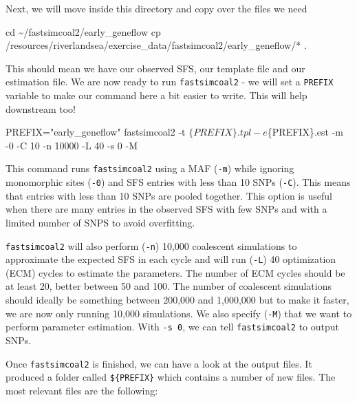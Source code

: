 \documentclass[
  letterpaper,
  DIV=11,
  numbers=noendperiod]{scrartcl}
\newenvironment{Shaded}{\begin{snugshade}}{\end{snugshade}}
\newcommand{\NormalTok}[1]{\textcolor[rgb]{0.00,0.23,0.31}{#1}}
\begin{document}
Next, we will move inside this directory and copy over the files we need

\begin{Shaded}
\begin{Highlighting}[]
\NormalTok{cd \textasciitilde{}/fastsimcoal2/early\_geneflow}
\NormalTok{cp /resources/riverlandsea/exercise\_data/fastsimcoal2/early\_geneflow/* .}
\end{Highlighting}
\end{Shaded}

This should mean we have our observed SFS, our template file and our
estimation file. We are now ready to run \texttt{fastsimcoal2} - we will
set a \texttt{PREFIX} variable to make our command here a bit easier to
write. This will help downstream too!

\begin{Shaded}
\begin{Highlighting}[]
\NormalTok{PREFIX="early\_geneflow"}
\NormalTok{fastsimcoal2 {-}t $\{PREFIX\}.tpl {-}e $\{PREFIX\}.est {-}m {-}0 {-}C 10 {-}n 10000 {-}L 40 {-}s 0 {-}M}
\end{Highlighting}
\end{Shaded}

This command runs \texttt{fastsimcoal2} using a MAF (\texttt{-m}) while
ignoring monomorphic sites (\texttt{-0}) and SFS entries with less than
10 SNPs (\texttt{-C}). This means that entries with less than 10 SNPs
are pooled together. This option is useful when there are many entries
in the observed SFS with few SNPs and with a limited number of SNPS to
avoid overfitting.

\texttt{fastsimcoal2} will also perform (\texttt{-n}) 10,000 coalescent
simulations to approximate the expected SFS in each cycle and will run
(\texttt{-L}) 40 optimization (ECM) cycles to estimate the parameters.
The number of ECM cycles should be at least 20, better between 50 and
100. The number of coalescent simulations should ideally be something
between 200,000 and 1,000,000 but to make it faster, we are now only
running 10,000 simulations. We also specify (\texttt{-M}) that we want
to perform parameter estimation. With \texttt{-s\ 0}, we can tell
\texttt{fastsimcoal2} to output SNPs.

Once \texttt{fastsimcoal2} is finished, we can have a look at the output
files. It produced a folder called \texttt{\$\{PREFIX\}} which contains
a number of new files. The most relevant files are the following:
\end{document}
